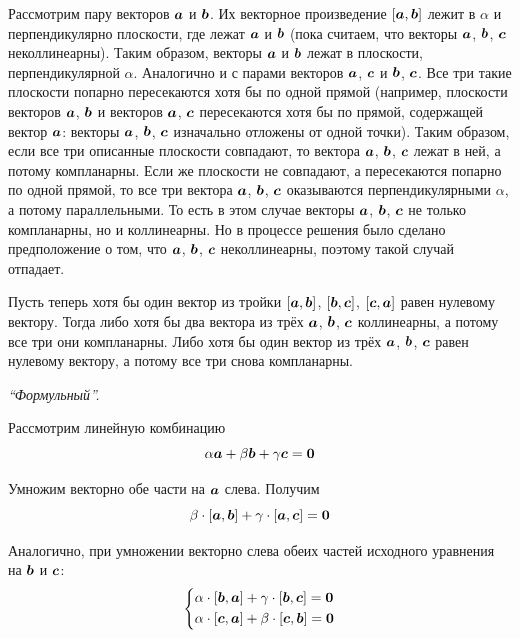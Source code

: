 \documentclass[a4paper,12pt]{article}
\begin{document}
\begin{solution}
    Рассмотрим пару векторов $\boldsymbol a$ и $\boldsymbol b$.
    Их векторное произведение $[\boldsymbol a, \boldsymbol b]$ лежит в $\alpha$ и перпендикулярно плоскости, где лежат $\boldsymbol a$ и $\boldsymbol b$ (пока считаем, что векторы $\boldsymbol a$, $\boldsymbol b$, $\boldsymbol c$ неколлинеарны).
    Таким образом, векторы $\boldsymbol a$ и $\boldsymbol b$ лежат в плоскости, перпендикулярной $\alpha$.
    Аналогично и с парами векторов $\boldsymbol a$, $\boldsymbol c$ и $\boldsymbol b$, $\boldsymbol c$.
    Все три такие плоскости попарно пересекаются хотя бы по одной прямой (например, плоскости векторов $\boldsymbol a$, $\boldsymbol b$ и векторов $\boldsymbol a$, $\boldsymbol c$ пересекаются хотя бы по прямой, содержащей вектор $\boldsymbol a$: векторы $\boldsymbol a$, $\boldsymbol b$, $\boldsymbol c$ изначально отложены от одной точки).
    Таким образом, если все три описанные плоскости совпадают, то вектора $\boldsymbol a$, $\boldsymbol b$, $\boldsymbol c$ лежат в ней, а потому компланарны.
    Если же плоскости не совпадают, а пересекаются попарно по одной прямой, то все три вектора $\boldsymbol a$, $\boldsymbol b$, $\boldsymbol c$ оказываются перпендикулярными $\alpha$, а потому параллельными.
    То есть в этом случае векторы $\boldsymbol a$, $\boldsymbol b$, $\boldsymbol c$ не только компланарны, но и коллинеарны.
    Но в процессе решения было сделано предположение о том, что $\boldsymbol a$, $\boldsymbol b$, $\boldsymbol c$ неколлинеарны, поэтому такой случай отпадает.
    
    Пусть теперь хотя бы один вектор из тройки $[\boldsymbol a, \boldsymbol b]$, $[\boldsymbol b, \boldsymbol c]$, $[\boldsymbol c, \boldsymbol a]$ равен нулевому вектору.
    Тогда либо хотя бы два вектора из трёх $\boldsymbol a$, $\boldsymbol b$, $\boldsymbol c$ коллинеарны, а потому все три они компланарны.
    Либо хотя бы один вектор из трёх $\boldsymbol a$, $\boldsymbol b$, $\boldsymbol c$ равен нулевому вектору, а потому все три снова компланарны.
  
    \bigskip
    
    \emph{``Формульный''.}
    
    Рассмотрим линейную комбинацию
    \[
      \alpha \boldsymbol a + \beta \boldsymbol b + \gamma \boldsymbol c = \boldsymbol 0
    \]
    
    Умножим векторно обе части на $\boldsymbol a$ слева.
    Получим
    \[
      \beta \cdot [\boldsymbol a, \boldsymbol b] + \gamma \cdot [\boldsymbol a, \boldsymbol c] = \boldsymbol 0
    \]
    
    Аналогично, при умножении векторно слева обеих частей исходного уравнения на $\boldsymbol b$ и $\boldsymbol c$:
    \[
      \left\{
        \begin{aligned}
          &\alpha \cdot [\boldsymbol b, \boldsymbol a] + \gamma \cdot [\boldsymbol b, \boldsymbol c] = \boldsymbol 0\\
          &\alpha \cdot [\boldsymbol c, \boldsymbol a] + \beta \cdot [\boldsymbol c, \boldsymbol b] = \boldsymbol 0
        \end{aligned}
      \right.
    \]
    

\end{solution}
\end{document}
